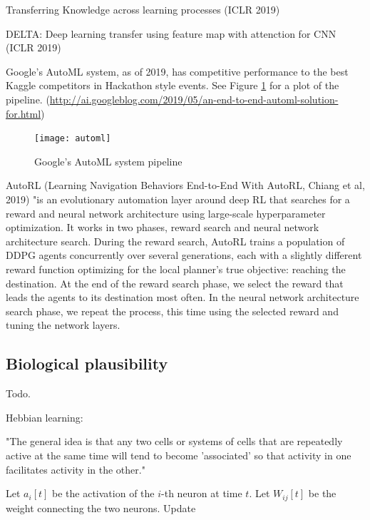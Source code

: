 \documentclass[english]{article}
\begin{document}
Transferring Knowledge across learning processes (ICLR 2019)

DELTA: Deep learning transfer using feature map with attenction for CNN (ICLR 2019)

\item Google's AutoML system, as of 2019, has competitive performance to the best Kaggle competitors in Hackathon style events. See Figure \ref{automl} for a plot of the pipeline. (\url{http://ai.googleblog.com/2019/05/an-end-to-end-automl-solution-for.html})


\begin{figure}[h!]
  \centering
  \texttt{[image: automl]}
  \caption{Google's AutoML system pipeline}
  \label{automl}
\end{figure}

\item AutoRL (Learning Navigation Behaviors End-to-End With AutoRL, Chiang et al, 2019)
"is an evolutionary automation layer around deep RL that searches for a reward and neural network architecture using large-scale hyperparameter optimization. It works in two phases, reward search and neural network architecture search. During the reward search, AutoRL trains a population of DDPG agents concurrently over several generations, each with a slightly different reward function optimizing for the local planner’s true objective: reaching the destination. At the end of the reward search phase, we select the reward that leads the agents to its destination most often. In the neural network architecture search phase, we repeat the process, this time using the selected reward and tuning the network layers.

\eenum 



\subsection{Biological plausibility}


\benum 
\item Todo.
\item Hebbian learning:

"The general idea is that any two cells or systems of cells that are repeatedly active at the same time will tend to become 'associated' so that activity in one facilitates activity in the other."

\item 

 Let $a_i[t]$ be the activation of the $i$-th neuron at time $t$. Let $W_{ij}[t]$ be the weight connecting the two neurons. Update
\end{document}
